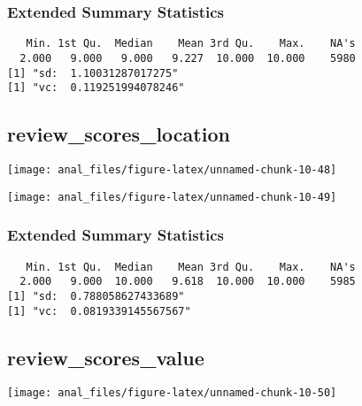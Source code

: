 \hypertarget{extended-summary-statistics-16}{%
\subsubsection{Extended Summary
Statistics}\label{extended-summary-statistics-16}}

\begin{verbatim}   Min. 1st Qu.  Median    Mean 3rd Qu.    Max.    NA's 
  2.000   9.000   9.000   9.227  10.000  10.000    5980 
[1] "sd:  1.10031287017275"
[1] "vc:  0.119251994078246"
\end{verbatim}

\pagebreak

\hypertarget{review_scores_location}{%
\subsection{review\_scores\_location}\label{review_scores_location}}

\begin{center}\texttt{[image: anal\_files/figure-latex/unnamed-chunk-10-48]} \end{center}

\begin{center}\texttt{[image: anal\_files/figure-latex/unnamed-chunk-10-49]} \end{center}

\hypertarget{extended-summary-statistics-17}{%
\subsubsection{Extended Summary
Statistics}\label{extended-summary-statistics-17}}

\begin{verbatim}   Min. 1st Qu.  Median    Mean 3rd Qu.    Max.    NA's 
  2.000   9.000  10.000   9.618  10.000  10.000    5985 
[1] "sd:  0.788058627433689"
[1] "vc:  0.0819339145567567"
\end{verbatim}

\pagebreak

\hypertarget{review_scores_value}{%
\subsection{review\_scores\_value}\label{review_scores_value}}

\begin{center}\texttt{[image: anal\_files/figure-latex/unnamed-chunk-10-50]} \end{center}


